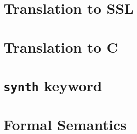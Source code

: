 \documentclass[runningheads]{llncs}
\begin{document}
\section{Translation to SSL}

\section{Translation to C}

\section{\texttt{synth} keyword}

\section{Formal Semantics}

% 
% 
% 
% 
% 
% 
% 



\end{document}
